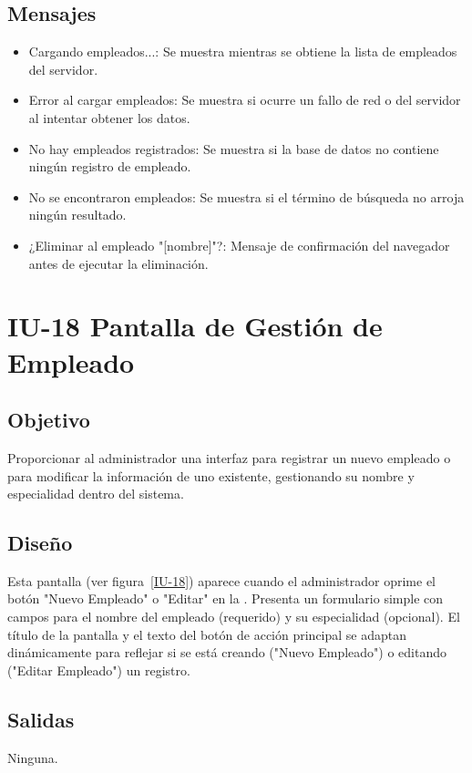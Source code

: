 \subsection{Mensajes}
\begin{itemize}
    \item Cargando empleados...: Se muestra mientras se obtiene la lista de empleados del servidor.
    \item Error al cargar empleados: Se muestra si ocurre un fallo de red o del servidor al intentar obtener los datos.
    \item No hay empleados registrados: Se muestra si la base de datos no contiene ningún registro de empleado.
    \item No se encontraron empleados: Se muestra si el término de búsqueda no arroja ningún resultado.
    \item ¿Eliminar al empleado "[nombre]"?: Mensaje de confirmación del navegador antes de ejecutar la eliminación.
\end{itemize}
\section{IU-18 Pantalla de Gestión de Empleado}

\subsection{Objetivo}
    Proporcionar al administrador una interfaz para registrar un nuevo empleado o para modificar la información de uno existente, gestionando su nombre y especialidad dentro del sistema.

\subsection{Diseño}
    Esta pantalla  (ver figura~\ref{IU-18}) aparece cuando el administrador oprime el botón "Nuevo Empleado" o "Editar" en la . Presenta un formulario simple con campos para el nombre del empleado (requerido) y su especialidad (opcional). El título de la pantalla y el texto del botón de acción principal se adaptan dinámicamente para reflejar si se está creando ("Nuevo Empleado") o editando ("Editar Empleado") un registro.


\subsection{Salidas}
    Ninguna.

